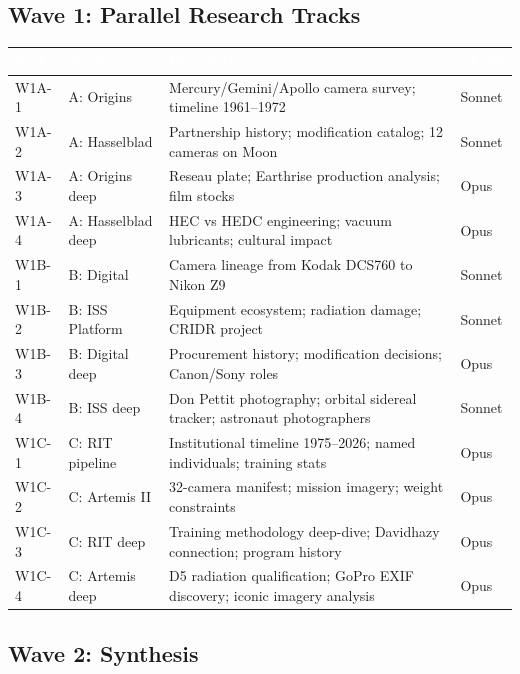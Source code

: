 \documentclass[11pt,letterpaper]{article}
\newcommand{\tableheader}[1]{\textbf{\sffamily\textcolor{white}{#1}}}
\begin{document}
\subsection{Wave 1: Parallel Research Tracks}

\begin{center}
\begin{tabularx}{\textwidth}{L{1.5cm}L{2cm}XL{2cm}}
\toprule
{}
\tableheader{Task} & \tableheader{Track} & \tableheader{Description} & \tableheader{Model} \\
\midrule
W1A-1 & A: Origins & Mercury/Gemini/Apollo camera survey; timeline 1961--1972 & Sonnet \\
W1A-2 & A: Hasselblad & Partnership history; modification catalog; 12 cameras on Moon & Sonnet \\
W1A-3 & A: Origins deep & Reseau plate; Earthrise production analysis; film stocks & Opus \\
W1A-4 & A: Hasselblad deep & HEC vs HEDC engineering; vacuum lubricants; cultural impact & Opus \\
W1B-1 & B: Digital & Camera lineage from Kodak DCS760 to Nikon Z9 & Sonnet \\
W1B-2 & B: ISS Platform & Equipment ecosystem; radiation damage; CRIDR project & Sonnet \\
W1B-3 & B: Digital deep & Procurement history; modification decisions; Canon/Sony roles & Opus \\
W1B-4 & B: ISS deep & Don Pettit photography; orbital sidereal tracker; astronaut photographers & Sonnet \\
W1C-1 & C: RIT pipeline & Institutional timeline 1975--2026; named individuals; training stats & Opus \\
W1C-2 & C: Artemis II & 32-camera manifest; mission imagery; weight constraints & Opus \\
W1C-3 & C: RIT deep & Training methodology deep-dive; Davidhazy connection; program history & Opus \\
W1C-4 & C: Artemis deep & D5 radiation qualification; GoPro EXIF discovery; iconic imagery analysis & Opus \\
\bottomrule
\end{tabularx}
\end{center}

\subsection{Wave 2: Synthesis}
\end{document}
